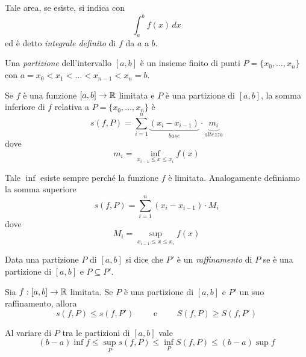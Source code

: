 Tale area, se esiste, si indica con
\begin{equation*}
\int_a^b f(x) \, dx
\end{equation*}
ed è detto \emph{integrale definito} di $f$ da $a$ a $b$.

\begin{definition}
Una \emph{partizione} dell'intervallo $[a,b]$ è un insieme finito di punti $P = \{x_0, \ldots, x_n\}$ con $a = x_0 < x_1 < \ldots < x_{n-1} < x_n = b$.
\end{definition}

Se $f$ è una funzione $[a,b] \to \mathbb R$ limitata e $P$ è una partizione di $[a,b]$, la somma inferiore di $f$ relativa a $P = \{x_0, \ldots, x_n\}$ è
\begin{equation*}
s(f,P) = \sum_{i=1}^n \underbrace{(x_i-x_{i-1})}_{base} \cdot \underbrace{m_i}_{altezza}
\end{equation*}
dove
\begin{equation*}
m_i = \inf_{x_{i-1} \le x \le x_i} f(x)
\end{equation*}

Tale $\inf$ esiste sempre perché la funzione $f$ è limitata. Analogamente definiamo la somma superiore
\begin{equation*}
s(f,P) = \sum_{i=1}^n (x_i-x_{i-1}) \cdot M_i
\end{equation*}
dove
\begin{equation*}
M_i = \sup_{x_{i-1} \le x \le x_i} f(x)
\end{equation*}

Data una partizione $P$ di $[a,b]$ si dice che $P'$ è un \emph{raffinamento} di $P$ se è una partizione di $[a,b]$ e $P \subseteq P'$.

\begin{proposition}
Sia $f:[a,b] \to \mathbb R$ limitata. Se $P$ è una partizione di $[a,b]$ e $P'$ un suo raffinamento, allora
\begin{equation*}
s(f,P) \le s(f, P') \qquad \text{ e } \qquad S(f,P) \ge S(f,P')
\end{equation*}

Al variare di $P$ tra le partizioni di $[a,b]$ vale
\begin{equation*}
(b-a) \inf f \le \sup_P s(f,P) \le \inf_P S(f,P) \le (b-a) \sup f
\end{equation*}
\end{proposition}

